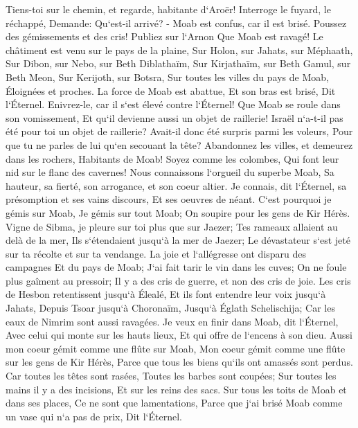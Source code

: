 \verse Tiens-toi sur le chemin, et regarde, habitante d`Aroër! Interroge le fuyard, le réchappé, Demande: Qu`est-il arrivé? - 
\verse Moab est confus, car il est brisé. Poussez des gémissements et des cris! Publiez sur l`Arnon Que Moab est ravagé! 
\verse Le châtiment est venu sur le pays de la plaine, Sur Holon, sur Jahats, sur Méphaath, 
\verse Sur Dibon, sur Nebo, sur Beth Diblathaïm, 
\verse Sur Kirjathaïm, sur Beth Gamul, sur Beth Meon, 
\verse Sur Kerijoth, sur Botsra, Sur toutes les villes du pays de Moab, Éloignées et proches. 
\verse La force de Moab est abattue, Et son bras est brisé, Dit l`Éternel. 
\verse Enivrez-le, car il s`est élevé contre l`Éternel! Que Moab se roule dans son vomissement, Et qu`il devienne aussi un objet de raillerie! 
\verse Israël n`a-t-il pas été pour toi un objet de raillerie? Avait-il donc été surpris parmi les voleurs, Pour que tu ne parles de lui qu`en secouant la tête? 
\verse Abandonnez les villes, et demeurez dans les rochers, Habitants de Moab! Soyez comme les colombes, Qui font leur nid sur le flanc des cavernes! 
\verse Nous connaissons l`orgueil du superbe Moab, Sa hauteur, sa fierté, son arrogance, et son coeur altier. 
\verse Je connais, dit l`Éternel, sa présomption et ses vains discours, Et ses oeuvres de néant. 
\verse C`est pourquoi je gémis sur Moab, Je gémis sur tout Moab; On soupire pour les gens de Kir Hérès. 
\verse Vigne de Sibma, je pleure sur toi plus que sur Jaezer; Tes rameaux allaient au delà de la mer, Ils s`étendaient jusqu`à la mer de Jaezer; Le dévastateur s`est jeté sur ta récolte et sur ta vendange. 
\verse La joie et l`allégresse ont disparu des campagnes Et du pays de Moab; J`ai fait tarir le vin dans les cuves; On ne foule plus gaîment au pressoir; Il y a des cris de guerre, et non des cris de joie. 
\verse Les cris de Hesbon retentissent jusqu`à Élealé, Et ils font entendre leur voix jusqu`à Jahats, Depuis Tsoar jusqu`à Choronaïm, Jusqu`à Églath Schelischija; Car les eaux de Nimrim sont aussi ravagées. 
\verse Je veux en finir dans Moab, dit l`Éternel, Avec celui qui monte sur les hauts lieux, Et qui offre de l`encens à son dieu. 
\verse Aussi mon coeur gémit comme une flûte sur Moab, Mon coeur gémit comme une flûte sur les gens de Kir Hérès, Parce que tous les biens qu`ils ont amassés sont perdus. 
\verse Car toutes les têtes sont rasées, Toutes les barbes sont coupées; Sur toutes les mains il y a des incisions, Et sur les reins des sacs. 
\verse Sur tous les toits de Moab et dans ses places, Ce ne sont que lamentations, Parce que j`ai brisé Moab comme un vase qui n`a pas de prix, Dit l`Éternel. 
